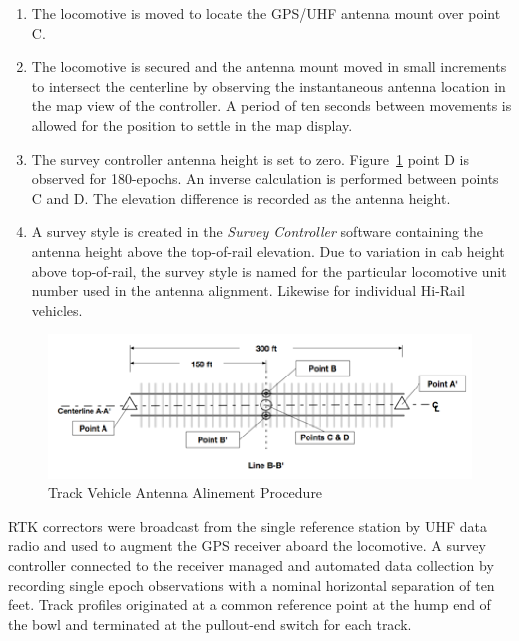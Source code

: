 \begin{enumerate}
\item The locomotive is moved to locate the GPS/UHF antenna mount over point C.
\item The locomotive is secured and the antenna mount moved in small increments to intersect the centerline by observing the instantaneous antenna location in the map view of the controller. A period of  ten seconds between movements is allowed for the position to settle in the map display.
\item The survey controller antenna height is set to zero. Figure~\ref{fig:antAlign} point D is observed for 180-epochs. An inverse calculation is performed between points C and D. The elevation difference is recorded as the antenna height.
\item A survey style is created in the \emph{Survey Controller} software containing the antenna height above the top-of-rail elevation. Due to variation in cab height above top-of-rail, the survey style is named for the particular locomotive unit number used in the antenna alignment. Likewise for individual Hi-Rail vehicles.
\end{enumerate}

\begin{figure}[h!]
  \begin{center}
    \includegraphics[scale=0.40]{graphics/antennaAlinement.png}
  \end{center}
  \caption{Track Vehicle Antenna Alinement Procedure}
  \label{fig:antAlign}
\vspace{-20pt}
\end{figure}

RTK correctors were broadcast from the single reference station by UHF data radio and used to augment the GPS receiver aboard the locomotive. A survey controller connected to the receiver managed and automated data collection by recording single epoch observations with a nominal horizontal separation of ten feet. Track profiles originated at a common reference point at the hump end of the bowl and terminated at the pullout-end switch for each track.

